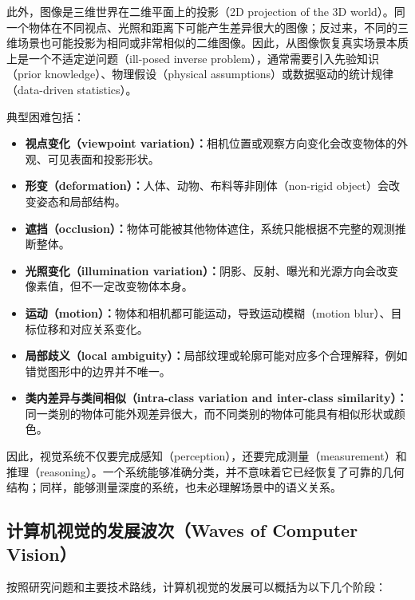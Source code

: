 \documentclass{ctexart}
\begin{document}
此外，图像是三维世界在二维平面上的投影（2D projection of the 3D world）。同一个物体在不同视点、光照和距离下可能产生差异很大的图像；反过来，不同的三维场景也可能投影为相同或非常相似的二维图像。因此，从图像恢复真实场景本质上是一个不适定逆问题（ill-posed inverse problem），通常需要引入先验知识（prior knowledge）、物理假设（physical assumptions）或数据驱动的统计规律（data-driven statistics）。

典型困难包括：

\begin{itemize}
    \item \textbf{视点变化（viewpoint variation）：}相机位置或观察方向变化会改变物体的外观、可见表面和投影形状。
    \item \textbf{形变（deformation）：}人体、动物、布料等非刚体（non-rigid object）会改变姿态和局部结构。
    \item \textbf{遮挡（occlusion）：}物体可能被其他物体遮住，系统只能根据不完整的观测推断整体。
    \item \textbf{光照变化（illumination variation）：}阴影、反射、曝光和光源方向会改变像素值，但不一定改变物体本身。
    \item \textbf{运动（motion）：}物体和相机都可能运动，导致运动模糊（motion blur）、目标位移和对应关系变化。
    \item \textbf{局部歧义（local ambiguity）：}局部纹理或轮廓可能对应多个合理解释，例如错觉图形中的边界并不唯一。
    \item \textbf{类内差异与类间相似（intra-class variation and inter-class similarity）：}同一类别的物体可能外观差异很大，而不同类别的物体可能具有相似形状或颜色。
\end{itemize}

因此，视觉系统不仅要完成感知（perception），还要完成测量（measurement）和推理（reasoning）。一个系统能够准确分类，并不意味着它已经恢复了可靠的几何结构；同样，能够测量深度的系统，也未必理解场景中的语义关系。

\subsection{计算机视觉的发展波次（Waves of Computer Vision）}

按照研究问题和主要技术路线，计算机视觉的发展可以概括为以下几个阶段：
\end{document}
